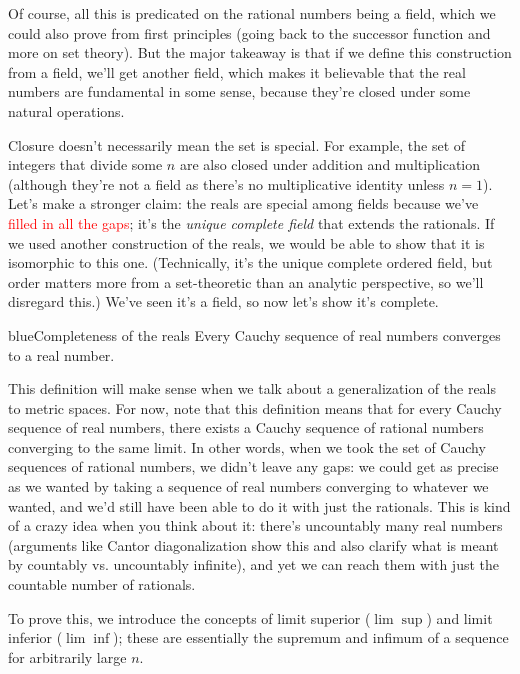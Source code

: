\documentclass[./analysis.tex]{subfiles}
\begin{document}
    Of course, all this is predicated on the rational numbers being a field, which we could also prove from first principles (going back to the successor function and more on set theory). But the major takeaway is that if we define this construction from a field, we'll get another field, which makes it believable that the real numbers are fundamental in some sense, because they're closed under some natural operations. 

    Closure doesn't necessarily mean the set is special. For example, the set of integers that divide some $n$ are also closed under addition and multiplication (although they're not a field as there's no multiplicative identity unless $n = 1$). Let's make a stronger claim: the reals are special among fields because we've \textcolor{red}{filled in all the gaps}; it's the \emph{unique complete field} that extends the rationals. If we used another construction of the reals, we would be able to show that it is isomorphic to this one. (Technically, it's the unique complete ordered field, but order matters more from a set-theoretic than an analytic perspective, so we'll disregard this.) We've seen it's a field, so now let's show it's complete.

    \begin{mycolorbox}{blue}{Completeness of the reals} Every Cauchy sequence of real numbers converges to a real number. \end{mycolorbox}

    This definition will make sense when we talk about a generalization of the reals to metric spaces. For now, note that this definition means that for every Cauchy sequence of real numbers, there exists a Cauchy sequence of rational numbers converging to the same limit. In other words, when we took the set of Cauchy sequences of rational numbers, we didn't leave any gaps: we could get as precise as we wanted by taking a sequence of real numbers converging to whatever we wanted, and we'd still have been able to do it with just the rationals. This is kind of a crazy idea when you think about it: there's uncountably many real numbers (arguments like Cantor diagonalization show this and also clarify what is meant by countably vs. uncountably infinite), and yet we can reach them with just the countable number of rationals.

    To prove this, we introduce the concepts of limit superior ($\lim\sup$) and limit inferior ($\lim\inf$); these are essentially the supremum and infimum of a sequence for arbitrarily large $n$.
\end{document}
